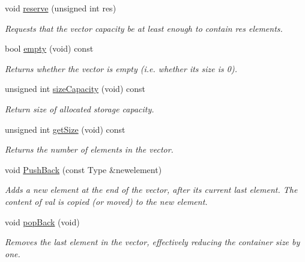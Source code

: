 \begin{DoxyCompactItemize}
void \hyperlink{classMyVector_a8793cd4a1ec1df2104f20d7b3fda2c7a}{reserve} (unsigned int res)
\begin{DoxyCompactList}\small\item\em Requests that the vector capacity be at least enough to contain res elements. \end{DoxyCompactList}\item 
bool \hyperlink{classMyVector_a9a4db5f7572c6dce12279a8ceb2798d5}{empty} (void) const
\begin{DoxyCompactList}\small\item\em Returns whether the vector is empty (i.\+e. whether its size is 0). \end{DoxyCompactList}\item 
unsigned int \hyperlink{classMyVector_acf22be00b40145fef2f9dc7a63511995}{size\+Capacity} (void) const
\begin{DoxyCompactList}\small\item\em Return size of allocated storage capacity. \end{DoxyCompactList}\item 
unsigned int \hyperlink{classMyVector_aa4f26bb090c1d23861811ea1983927f1}{get\+Size} (void) const
\begin{DoxyCompactList}\small\item\em Returns the number of elements in the vector. \end{DoxyCompactList}\item 
void \hyperlink{classMyVector_a9e3b2952308f179196339693d16df039}{Push\+Back} (const Type \&newelement)
\begin{DoxyCompactList}\small\item\em Adds a new element at the end of the vector, after its current last element. The content of val is copied (or moved) to the new element. \end{DoxyCompactList}\item 
\mbox{\label{classMyVector_aa666d4e5ec09b7360bd0ce830cd2fdeb}} 
void \hyperlink{classMyVector_aa666d4e5ec09b7360bd0ce830cd2fdeb}{pop\+Back} (void)
\begin{DoxyCompactList}\small\item\em Removes the last element in the vector, effectively reducing the container size by one. \end{DoxyCompactList}\item 
\mbox{\label{classMyVector_a38fd78190795c1d26ce5afee7aabcdaa}} 

\end{DoxyCompactItemize}
